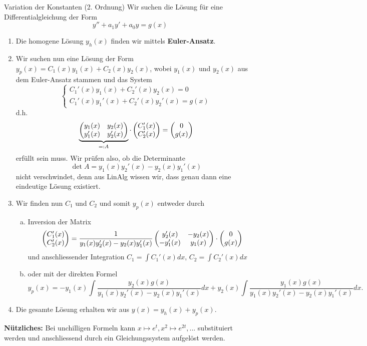 \begin{Rezept}{Variation der Konstanten (2. Ordnung)}{}
	Wir suchen die Lösung für eine Differentialgleichung der Form
	\begin{equation*}
	y'' + a_1 y' + a_0 y = g(x)
	\end{equation*}
	\begin{enumerate}
		\item Die homogene Lösung $y_h(x)$ finden wir mittels \textbf{Euler-Ansatz}.
		\item Wir suchen nun eine Lösung der Form $y_p(x) = C_1(x) y_1(x) + C_2(x) y_2(x)$, wobei $y_1(x)$ und $y_2(x)$ aus dem Euler-Ansatz stammen und das System
		\begin{equation*}
		\begin{cases} C_1'(x)y_1(x) + C_2'(x)y_2(x)=0\\C_1'(x)y_1'(x) + C_2'(x)y_2'(x)=g(x)\end{cases}
		\end{equation*}
		d.h.
		\begin{equation*}
		\underbrace{\begin{pmatrix}
			y_1(x) &y_2(x)\\y_1'(x) &y_2'(x)
			\end{pmatrix}}_{=:A} \cdot \begin{pmatrix} C_1'(x) \\ C_2'(x)\end{pmatrix} = \begin{pmatrix} 0 \\ g(x)\end{pmatrix}
		\end{equation*}
		erfüllt sein muss. Wir prüfen also, ob die Determinante
		\begin{equation*}
		\det A = y_1(x)y_2'(x)-y_2(x)y_1'(x)
		\end{equation*}
		nicht verschwindet, denn aus LinAlg wissen wir, dass genau dann eine eindeutige Lösung existiert.
		\item  Wir finden nun $C_1$ und $C_2$ und somit $y_p(x)$ entweder durch
		\begin{enumerate}[(a)]
			\item Inversion der Matrix \begin{equation*}
			\begin{pmatrix} C_1'(x) \\ C_2'(x)\end{pmatrix} = \frac{1}{y_1(x)y_2'(x)-y_2(x)y_1'(x)} \begin{pmatrix}
			y_2'(x) & -y_2(x)\\-y_1'(x) &y_1(x)
			\end{pmatrix}\cdot\begin{pmatrix} 0 \\ g(x)\end{pmatrix}
			\end{equation*}
			und anschliessender Integration $C_1 = \int C_1'(x) dx$, $C_2 = \int C_2'(x) dx$ 
			\item oder mit der direkten Formel
			\begin{equation*}
			y_p(x) = -y_1(x) \int \frac{y_2(x) g(x)}{y_1(x)y_2'(x)-y_2(x)y_1'(x)} dx + y_2(x) \int \frac{y_1(x) g(x)}{y_1(x)y_2'(x)-y_2(x)y_1'(x)}dx.
			\end{equation*}
		\end{enumerate}
		\item Die gesamte Lösung erhalten wir aus $y(x) = y_h(x) + y_p(x)$.
	\end{enumerate}
	
	\textbf{Nützliches:} Bei unchilligen Formeln kann $x\mapsto e^t, x^2\mapsto e^{2t},...$ substituiert werden und anschliessend durch ein Gleichungssystem aufgelöst werden.
\end{Rezept}

